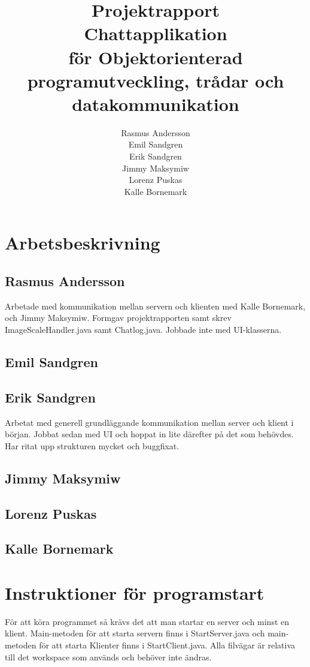 \documentclass[a4paper,11pt]{article}
\title{Projektrapport\\
\large{Chattapplikation}\\
\large{för Objektorienterad programutveckling, trådar och datakommunikation} }
\author{Rasmus Andersson\\Emil Sandgren\\Erik Sandgren\\Jimmy Maksymiw\\Lorenz Puskas\\Kalle Bornemark}
\begin{document}
\pagestyle{fancy}
\maketitle
\newpage
\tableofcontents
\newpage
\section{Arbetsbeskrivning}

\subsection{Rasmus Andersson} 
Arbetade med kommunikation mellan servern och klienten med Kalle Bornemark, och Jimmy Maksymiw. Formgav projektrapporten samt skrev ImageScaleHandler.java samt Chatlog.java. Jobbade inte med UI-klasserna.

\subsection{Emil Sandgren} 
\subsection{Erik Sandgren} 

Arbetat med generell grundläggande kommunikation mellan server och klient i början. Jobbat sedan med UI och hoppat in lite därefter på det som behövdes. Har ritat upp strukturen mycket och buggfixat.

\subsection{Jimmy Maksymiw} 
\subsection{Lorenz Puskas} 
\subsection{Kalle Bornemark} 
\newpage

\section{Instruktioner för programstart}
För att köra programmet så krävs det att man startar en server och minst en klient. Main-metoden för att starta servern finns i StartServer.java och main-metoden för att starta Klienter finns i StartClient.java. Alla filvägar är relativa till det workspace som används och behöver inte ändras.
\end{document}
